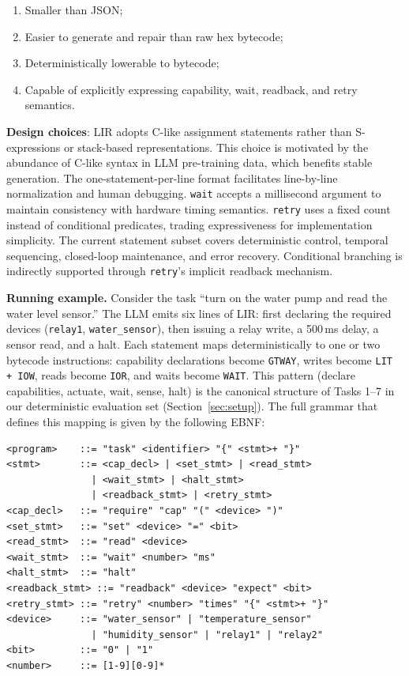 \documentclass[a4paper,fleqn,longmktitle]{cas-dc}
\begin{document}
\begin{enumerate}
  \item Smaller than JSON;
  \item Easier to generate and repair than raw hex bytecode;
  \item Deterministically lowerable to bytecode;
  \item Capable of explicitly expressing capability, wait, readback, and retry semantics.
\end{enumerate}

\textbf{Design choices}: LIR adopts C-like assignment statements rather than S-expressions or stack-based representations. This choice is motivated by the abundance of C-like syntax in LLM pre-training data, which benefits stable generation. The one-statement-per-line format facilitates line-by-line normalization and human debugging. \texttt{wait} accepts a millisecond argument to maintain consistency with hardware timing semantics. \texttt{retry} uses a fixed count instead of conditional predicates, trading expressiveness for implementation simplicity. The current statement subset covers deterministic control, temporal sequencing, closed-loop maintenance, and error recovery. Conditional branching is indirectly supported through \texttt{retry}'s implicit readback mechanism.

\textbf{Running example.} Consider the task ``turn on the water pump and read the water level sensor.'' The LLM emits six lines of LIR: first declaring the required devices (\texttt{relay1}, \texttt{water\_sensor}), then issuing a relay write, a 500\,ms delay, a sensor read, and a halt. Each statement maps deterministically to one or two bytecode instructions: capability declarations become \texttt{GTWAY}, writes become \texttt{LIT\,+\,IOW}, reads become \texttt{IOR}, and waits become \texttt{WAIT}. This pattern (declare capabilities, actuate, wait, sense, halt) is the canonical structure of Tasks 1--7 in our deterministic evaluation set (Section~\ref{sec:setup}). The full grammar that defines this mapping is given by the following EBNF:

\begin{lstlisting}[style=mirstyle,caption={LIR EBNF grammar},label={lst:grammar}]
<program>    ::= "task" <identifier> "{" <stmt>+ "}"
<stmt>       ::= <cap_decl> | <set_stmt> | <read_stmt>
               | <wait_stmt> | <halt_stmt>
               | <readback_stmt> | <retry_stmt>
<cap_decl>   ::= "require" "cap" "(" <device> ")"
<set_stmt>   ::= "set" <device> "=" <bit>
<read_stmt>  ::= "read" <device>
<wait_stmt>  ::= "wait" <number> "ms"
<halt_stmt>  ::= "halt"
<readback_stmt> ::= "readback" <device> "expect" <bit>
<retry_stmt> ::= "retry" <number> "times" "{" <stmt>+ "}"
<device>     ::= "water_sensor" | "temperature_sensor"
               | "humidity_sensor" | "relay1" | "relay2"
<bit>        ::= "0" | "1"
<number>     ::= [1-9][0-9]*
\end{lstlisting}
\end{document}
